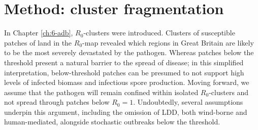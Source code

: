 
\section{Method: cluster fragmentation}
\label{sec:fragmentation-method}

In Chapter \ref{ch:6-adb}, $R_0$-clusters were introduced.
Clusters of susceptible patches of land in the $R_0$-map revealed which regions in Great Britain are likely to be the most severely devastated by the pathogen. 
Whereas patches below the threshold present a natural barrier to the spread of disease;
in this simplified interpretation, below-threshold patches can be presumed to not support high levels of infected biomass and infectious spore production.
Moving forward, we assume that the pathogen will remain confined within isolated $R_0$-clusters and not spread through patches below $R_0=1$.
Undoubtedly, several assumptions underpin this argument, including the omission of LDD, both wind-borne and human-mediated, alongside stochastic outbreaks below the threshold.
 
